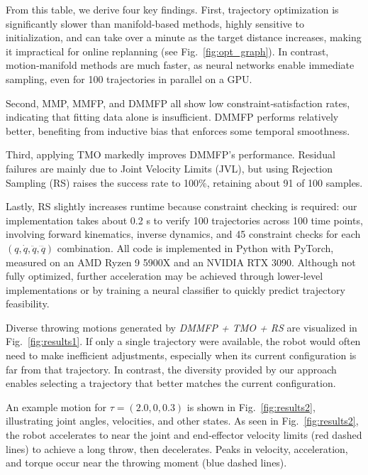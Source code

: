 From this table, we derive four key findings.  
First, trajectory optimization is significantly slower than manifold-based methods, highly sensitive to initialization, and can take over a minute as the target distance increases, making it impractical for online replanning (see Fig.~\ref{fig:opt_graph}).  
In contrast, motion‑manifold methods are much faster, as neural networks enable immediate sampling, even for 100 trajectories in parallel on a GPU.

Second, MMP, MMFP, and DMMFP all show low constraint‑satisfaction rates, indicating that fitting data alone is insufficient.  
DMMFP performs relatively better, benefiting from inductive bias that enforces some temporal smoothness.

Third, applying TMO markedly improves DMMFP’s performance.  
Residual failures are mainly due to Joint Velocity Limits (JVL), but using Rejection Sampling (RS) raises the success rate to 100\%, retaining about 91 of 100 samples.

Lastly, RS slightly increases runtime because constraint checking is required: our implementation takes about 0.2 s to verify 100 trajectories across 100 time points, involving forward kinematics, inverse dynamics, and 45 constraint checks for each $(q,\dot q,\ddot q,\dddot q)$ combination.  
All code is implemented in Python with PyTorch, measured on an AMD Ryzen 9 5900X and an NVIDIA RTX 3090.  
Although not fully optimized, further acceleration may be achieved through lower‑level implementations or by training a neural classifier to quickly predict trajectory feasibility.

Diverse throwing motions generated by {\it DMMFP + TMO + RS} are visualized in Fig.~\ref{fig:results1}.  
If only a single trajectory were available, the robot would often need to make inefficient adjustments, especially when its current configuration is far from that trajectory.  
In contrast, the diversity provided by our approach enables selecting a trajectory that better matches the current configuration.

An example motion for $\tau = (2.0,0,0.3)$ is shown in Fig.~\ref{fig:results2}, illustrating joint angles, velocities, and other states.  
As seen in Fig.~\ref{fig:results2}, the robot accelerates to near the joint and end‑effector velocity limits (red dashed lines) to achieve a long throw, then decelerates.  
Peaks in velocity, acceleration, and torque occur near the throwing moment (blue dashed lines).



